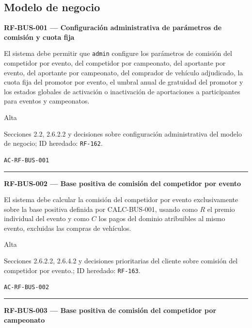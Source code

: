 \documentclass[10pt,letterpaper]{article}
\begin{document}
\subsection{Modelo de negocio}
\noindent\textbf{RF-BUS-001 --- Configuración administrativa de parámetros de comisión y cuota fija}\par
\begin{description}[style=nextline,leftmargin=3.15cm,labelwidth=2.8cm,font=\normalfont\bfseries]
\item[Obligación] El sistema debe permitir que \texttt{admin} configure los parámetros de comisión del competidor por evento, del competidor por campeonato, del aportante por evento, del aportante por campeonato, del comprador de vehículo adjudicado, la cuota fija del promotor por evento, el umbral anual de gratuidad del promotor y los estados globales de activación o inactivación de aportaciones a participantes para eventos y campeonatos.
\item[Prioridad] Alta
\item[Procedencia] Secciones 2.2, 2.6.2.2 y decisiones sobre configuración administrativa del modelo de negocio; ID heredado: \texttt{RF-162}.
\item[Verificación] \texttt{AC-RF-BUS-001}
\end{description}
\vspace{0.25em}\hrule\vspace{0.65em}
\noindent\textbf{RF-BUS-002 --- Base positiva de comisión del competidor por evento}\par
\begin{description}[style=nextline,leftmargin=3.15cm,labelwidth=2.8cm,font=\normalfont\bfseries]
\item[Obligación] El sistema debe calcular la comisión del competidor por evento exclusivamente sobre la base positiva definida por CALC-BUS-001, usando como $R$ el premio individual del evento y como $C$ los pagos del dominio atribuibles al mismo evento, excluidas las compras de vehículos.
\item[Prioridad] Alta
\item[Procedencia] Secciones 2.6.2.2, 2.6.4.2 y decisiones prioritarias del cliente sobre comisión del competidor por evento.; ID heredado: \texttt{RF-163}.
\item[Verificación] \texttt{AC-RF-BUS-002}
\end{description}
\vspace{0.25em}\hrule\vspace{0.65em}
\noindent\textbf{RF-BUS-003 --- Base positiva de comisión del competidor por campeonato}\par
\end{document}
